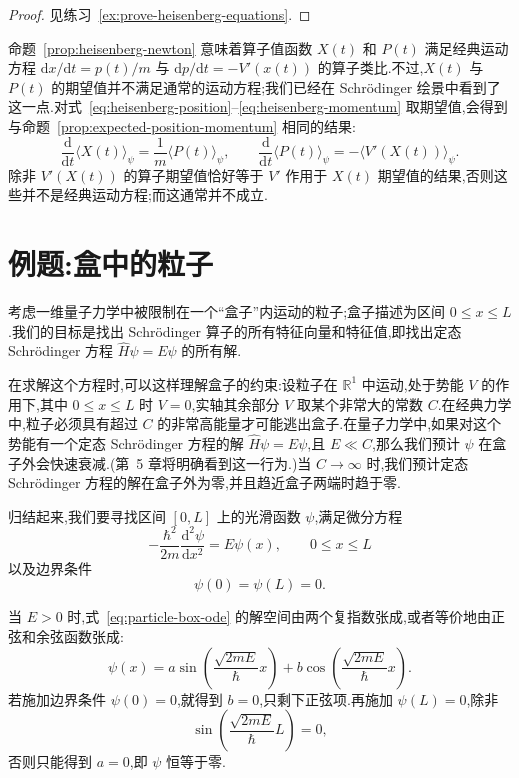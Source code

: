 \begin{proof}
见练习~\ref{ex:prove-heisenberg-equations}.
\end{proof}

命题~\ref{prop:heisenberg-newton} 意味着算子值函数 \(X(t)\) 和 \(P(t)\) 满足经典运动方程 \(\mathrm{d}x/\mathrm{d}t=p(t)/m\) 与 \(\mathrm{d}p/\mathrm{d}t=-V'(x(t))\) 的算子类比.不过,\(X(t)\) 与 \(P(t)\) 的期望值并不满足通常的运动方程;我们已经在 Schrödinger 绘景中看到了这一点.对式~\eqref{eq:heisenberg-position}--\eqref{eq:heisenberg-momentum} 取期望值,会得到与命题~\ref{prop:expected-position-momentum} 相同的结果:
\[
\frac{\mathrm{d}}{\mathrm{d}t}\langle X(t)\rangle_{\psi}
=\frac{1}{m}\langle P(t)\rangle_{\psi},
\qquad
\frac{\mathrm{d}}{\mathrm{d}t}\langle P(t)\rangle_{\psi}
=-\langle V'(X(t))\rangle_{\psi}.
\]
除非 \(V'(X(t))\) 的算子期望值恰好等于 \(V'\) 作用于 \(X(t)\) 期望值的结果,否则这些并不是经典运动方程;而这通常并不成立.

\section{例题:盒中的粒子}\label{sec:particle-in-box}

考虑一维量子力学中被限制在一个“盒子”内运动的粒子;盒子描述为区间 \(0\le x\le L\).我们的目标是找出 Schrödinger 算子的所有特征向量和特征值,即找出定态 Schrödinger 方程 \(\widehat H\psi=E\psi\) 的所有解.

在求解这个方程时,可以这样理解盒子的约束:设粒子在 \(\mathbb{R}^{1}\) 中运动,处于势能 \(V\) 的作用下,其中 \(0\le x\le L\) 时 \(V=0\),实轴其余部分 \(V\) 取某个非常大的常数 \(C\).在经典力学中,粒子必须具有超过 \(C\) 的非常高能量才可能逃出盒子.在量子力学中,如果对这个势能有一个定态 Schrödinger 方程的解 \(\widehat H\psi=E\psi\),且 \(E\ll C\),那么我们预计 \(\psi\) 在盒子外会快速衰减.(第~5 章将明确看到这一行为.)当 \(C\to\infty\) 时,我们预计定态 Schrödinger 方程的解在盒子外为零,并且趋近盒子两端时趋于零.

归结起来,我们要寻找区间 \([0,L]\) 上的光滑函数 \(\psi\),满足微分方程
\begin{equation}
-\frac{\hbar^{2}}{2m}\frac{\mathrm{d}^{2}\psi}{\mathrm{d}x^{2}}
=E\psi(x),\qquad 0\le x\le L
\label{eq:particle-box-ode}
\end{equation}
以及边界条件
\begin{equation}
\psi(0)=\psi(L)=0.
\label{eq:particle-box-boundary}
\end{equation}

当 \(E>0\) 时,式~\eqref{eq:particle-box-ode} 的解空间由两个复指数张成,或者等价地由正弦和余弦函数张成:
\begin{equation}
\psi(x)=a\sin\left(\frac{\sqrt{2mE}}{\hbar}x\right)
+b\cos\left(\frac{\sqrt{2mE}}{\hbar}x\right).
\label{eq:particle-box-general}
\end{equation}
若施加边界条件 \(\psi(0)=0\),就得到 \(b=0\),只剩下正弦项.再施加 \(\psi(L)=0\),除非
\begin{equation}
\sin\left(\frac{\sqrt{2mE}}{\hbar}L\right)=0,
\label{eq:particle-box-sine-condition}
\end{equation}
否则只能得到 \(a=0\),即 \(\psi\) 恒等于零.

